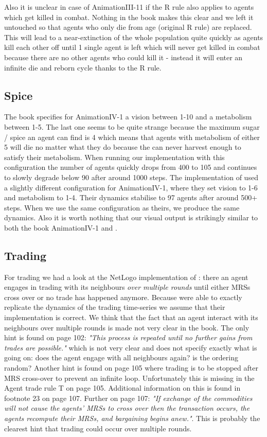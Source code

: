 Also it is unclear in case of AnimationIII-11 if the R rule also applies to agents which get killed in combat. Nothing in the book makes this clear and we left it untouched so that agents who only die from age (original R rule) are replaced. This will lead to a near-extinction of the whole population quite quickly as agents kill each other off until 1 single agent is left which will never get killed in combat because there are no other agents who could kill it - instead it will enter an infinite die and  reborn cycle thanks to the R rule.

\subsection{Spice}
The book specifies for AnimationIV-1 a vision between 1-10 and a metabolism between 1-5. The last one seems to be quite strange because the maximum sugar / spice an agent can find is 4 which means that agents with metabolism of either 5 will die no matter what they do because the can never harvest enough to satisfy their metabolism. When running our implementation with this configuration the number of agents quickly drops from 400 to 105 and continues to slowly degrade below 90 after around 1000 steps.
The implementation of \cite{weaver_replicating_2009} used a slightly different configuration for AnimationIV-1, where they set vision to 1-6 and metabolism to 1-4. Their dynamics stabilise to 97 agents after around 500+ steps. When we use the same configuration as theirs, we produce the same dynamics.
Also it is worth nothing that our visual output is strikingly similar to both the book AnimationIV-1 and \cite{weaver_replicating_2009}.

\subsection{Trading}
For trading we had a look at the NetLogo implementation of \cite{weaver_replicating_2009}: there an agent engages in trading with its neighbours \textit{over multiple rounds} until either MRSs cross over or no trade has happened anymore. Because \cite{weaver_replicating_2009} were able to exactly replicate the dynamics of the trading time-series we assume that their implementation is correct. We think that the fact that an agent interact with its neighbours over multiple rounds is made not very clear in the book. The only hint is found on page 102: \textit{"This process is repeated until no further gains from trades are possible."} which is not very clear and does not specify exactly what is going on: does the agent engage with all neighbours again? is the ordering random? Another hint is found on page 105 where trading is to be stopped after MRS cross-over to prevent an infinite loop. Unfortunately this is missing in the Agent trade rule T on page 105. Additional information on this is found in footnote 23 on page 107. Further on page 107: \textit{"If exchange of the commodities will not cause the agents' MRSs to cross over then the transaction occurs, the agents recompute their MRSs, and bargaining begins anew."}. This is probably the clearest hint that trading could occur over multiple rounds.


